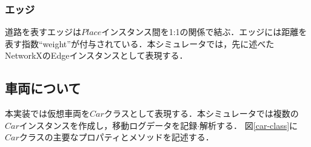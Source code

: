\subsubsection{エッジ}
道路を表すエッジは$Place$インスタンス間を1:1の関係で結ぶ．エッジには距離を表す指数``weight''が付与されている．本シミュレータでは，先に述べたNetworkXのEdgeインスタンスとして表現する．


\subsection{車両について}
\label{car-implementation}
本実装では仮想車両を$Car$クラスとして表現する．本シミュレータでは複数の$Car$インスタンスを作成し，移動ログデータを記録$\cdot$解析する．
図\ref{car-class}に$Car$クラスの主要なプロパティとメソッドを記述する．


